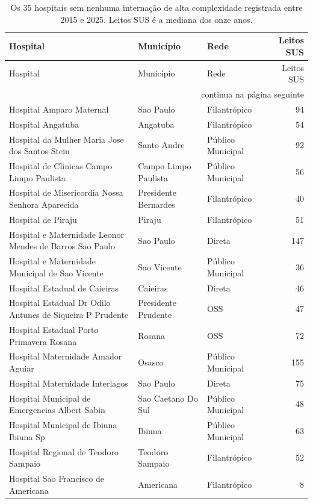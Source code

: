 {\small
\begin{longtable}{p{}p{}lr}
\caption{Os 35 hospitais sem nenhuma internação de alta complexidade
registrada entre 2015 e 2025. Leitos SUS é a mediana dos onze anos.}
\label{tab:semaltacomplex}\\
\toprule
Hospital & Município & Rede & Leitos SUS \\
\midrule
\endfirsthead
\toprule
Hospital & Município & Rede & Leitos SUS \\
\midrule
\endhead
\midrule
\multicolumn{4}{r}{\footnotesize continua na página seguinte}\\
\endfoot
\bottomrule
\endlastfoot
Hospital Amparo Maternal & Sao Paulo & Filantrópico & 94 \\
Hospital Angatuba & Angatuba & Filantrópico & 54 \\
Hospital da Mulher Maria Jose dos Santos Stein & Santo Andre & Público Municipal & 92 \\
Hospital de Clinicas Campo Limpo Paulista & Campo Limpo Paulista & Público Municipal & 56 \\
Hospital de Misericordia Nossa Senhora Aparecida & Presidente Bernardes & Filantrópico & 40 \\
Hospital de Piraju & Piraju & Filantrópico & 51 \\
Hospital e Maternidade Leonor Mendes de Barros Sao Paulo & Sao Paulo & Direta & 147 \\
Hospital e Maternidade Municipal de Sao Vicente & Sao Vicente & Público Municipal & 36 \\
Hospital Estadual de Caieiras & Caieiras & Direta & 46 \\
Hospital Estadual Dr Odilo Antunes de Siqueira P Prudente & Presidente Prudente & OSS & 47 \\
Hospital Estadual Porto Primavera Rosana & Rosana & OSS & 72 \\
Hospital Maternidade Amador Aguiar & Osasco & Público Municipal & 155 \\
Hospital Maternidade Interlagos & Sao Paulo & Direta & 75 \\
Hospital Municipal de Emergencias Albert Sabin & Sao Caetano Do Sul & Público Municipal & 48 \\
Hospital Municipal de Ibiuna Ibiuna Sp & Ibiuna & Público Municipal & 63 \\
Hospital Regional de Teodoro Sampaio & Teodoro Sampaio & Filantrópico & 52 \\
Hospital Sao Francisco de Americana & Americana & Filantrópico & 8 \\

\end{longtable}}
